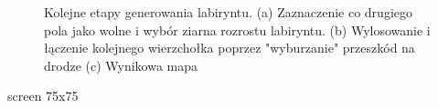 \begin{figure}
    \centering
        \qquad
        \qquad
    \label{fig:etapy-generowania}
    \caption{Kolejne etapy generowania labiryntu.
    (a) Zaznaczenie co drugiego pola jako wolne i wybór ziarna rozrostu labiryntu.
    (b) Wylosowanie i łączenie kolejnego wierzchołka poprzez "wyburzanie" przeszkód na drodze
    (c) Wynikowa mapa}
\end{figure}


screen 75x75
